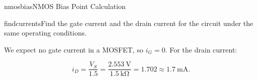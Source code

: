 \begin{mainquestion}{nmosbias}{NMOS Bias Point Calculation}
\begin{partquestion}{findcurrents}{Find the gate current and the drain current for the circuit under the same operating conditions.}
\begin{answer}
We expect no gate current in a MOSFET, so $i_{G} = 0$. For the drain current:

\[
i_{D} = \frac{V_{S}}{1.5} = \frac{\qty{2.553}{\volt}}{\qty{1.5}{\kilo\ohm}} = 1.702 \approx \qty{1.7}{\milli\ampere}.
\]
\end{answer}
\end{partquestion}

\end{mainquestion}
